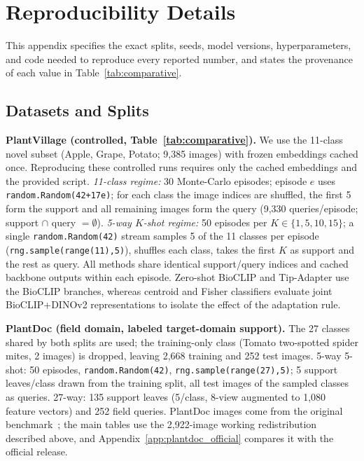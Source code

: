 \documentclass[preprint,12pt]{elsarticle}
\begin{document}
\section{Reproducibility Details}
\label{app:repro}
This appendix specifies the exact splits, seeds, model versions, hyperparameters, and code needed to reproduce every reported number, and states the provenance of each value in Table~\ref{tab:comparative}.

\subsection{Datasets and Splits}
\textbf{PlantVillage (controlled, Table~\ref{tab:comparative}).} We use the 11-class novel subset (Apple, Grape, Potato; 9{,}385 images) with frozen embeddings cached once. Reproducing these controlled runs requires only the cached embeddings and the provided script. \emph{11-class regime:} 30 Monte-Carlo episodes; episode $e$ uses \texttt{random.Random(42+17e)}; for each class the image indices are shuffled, the first 5 form the support and all remaining images form the query (9{,}330 queries/episode; support $\cap$ query $=\emptyset$). \emph{5-way $K$-shot regime:} 50 episodes per $K\in\{1,5,10,15\}$; a single \texttt{random.Random(42)} stream samples 5 of the 11 classes per episode (\texttt{rng.sample(range(11),5)}), shuffles each class, takes the first $K$ as support and the rest as query. All methods share identical support/query indices and cached backbone outputs within each episode. Zero-shot BioCLIP and Tip-Adapter use the BioCLIP branches, whereas centroid and Fisher classifiers evaluate joint BioCLIP+DINOv2 representations to isolate the effect of the adaptation rule.

\textbf{PlantDoc (field domain, labeled target-domain support).} The 27 classes shared by both splits are used; the training-only class (Tomato two-spotted spider mites, 2 images) is dropped, leaving 2{,}668 training and 252 test images. 5-way 5-shot: 50 episodes, \texttt{random.Random(42)}, \texttt{rng.sample(range(27),5)}; 5 support leaves/class drawn from the training split, all test images of the sampled classes as queries. 27-way: 135 support leaves (5/class, 8-view augmented to 1{,}080 feature vectors) and 252 field queries. PlantDoc images come from the original benchmark~\cite{singh2020plantdoc}; the main tables use the 2{,}922-image working redistribution described above, and Appendix~\ref{app:plantdoc_official} compares it with the official release.
\end{document}
